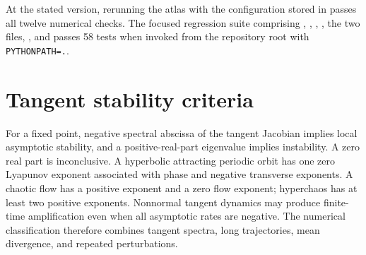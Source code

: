 \documentclass[11pt,a4paper]{article}
\theoremstyle{definition}
\begin{document}
At the stated version, rerunning the atlas with the configuration stored in
 passes
all twelve numerical checks.  The focused regression suite comprising
,
,
,
, the two  files,
, and
 passes 58
tests when invoked from the repository root with \texttt{PYTHONPATH=.}.

\section{Tangent stability criteria}

For a fixed point, negative spectral abscissa of the tangent Jacobian implies local
asymptotic stability, and a positive-real-part eigenvalue implies instability.  A zero
real part is inconclusive.  A hyperbolic attracting periodic orbit has one zero
Lyapunov exponent associated with phase and negative transverse exponents. A chaotic
flow has a positive exponent and a zero flow exponent; hyperchaos has at least two
positive exponents. Nonnormal tangent dynamics may produce finite-time amplification
even when all asymptotic rates are negative. The numerical classification therefore
combines tangent spectra, long trajectories, mean divergence, and repeated
perturbations.

\begingroup
\small
\sloppy
\hfuzz=1pt
\setlength{\emergencystretch}{6em}


\endgroup
\end{document}
